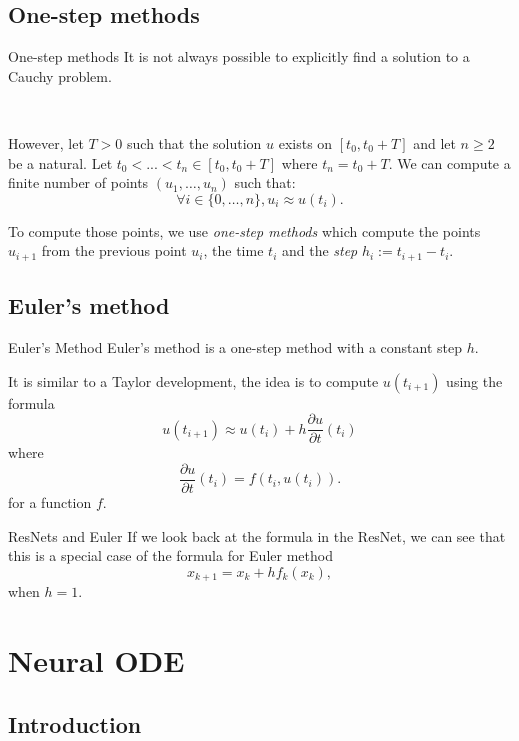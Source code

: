 \documentclass[11pt]{beamer}
\begin{document}
\subsection{One-step methods}
\begin{frame}{One-step methods}
It is not always possible to explicitly find a solution to a Cauchy problem. 

~

However, let $T > 0$ such that the solution $u$ exists on $[t_0, t_0 + T]$ and let $n \geqslant 2$ be a natural. Let  $t_0 < ... < t_n \in [t_0, t_0 + T]$ where $t_n = t_0 + T$. We can compute a finite number of points $(u_1, \dots, u_n)$ such that:
$$
\forall i\in \{0,\dots, n\},  u_i \approx u(t_i).
$$

To compute those points, we use \textit{one-step methods} which compute the points $u_{i+1}$ from the previous point $u_i$, the time $t_i$ and the \textit{step} $h_i := t_{i+1} - t_i$.
\end{frame}

\subsection{Euler's method} \label{euler}
\begin{frame}{Euler's Method}
Euler's method is a one-step method with a constant step $h$. 

It is similar to a Taylor development, the idea is to compute $u(t_{i+1})$ using the formula
\begin{equation}\label{eqeuler}
u(t_{i+1}) \approx u(t_i) + h\frac{\partial u}{\partial t}(t_i)
\end{equation}
where 
$$
\frac{\partial u}{\partial t}(t_i) = f(t_i, u(t_i)).
$$
for a function $f$.
\end{frame}

\begin{frame}{ResNets and Euler}
If we look back at the formula in the ResNet, we can see
that this is a special case of the formula for Euler method
\begin{equation*}
x_{k+1} = x_k + hf_k(x_k),
\end{equation*}
when $h = 1$.

\end{frame}

\section{Neural ODE} \label{neuralode}
\subsection{Introduction}
\end{document}
